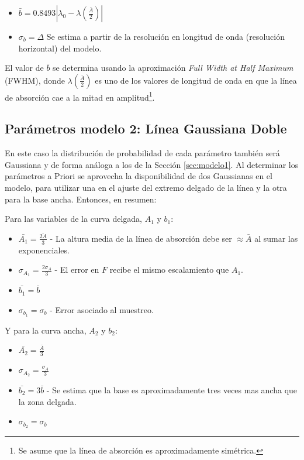 \documentclass{article}
\begin{document}
\begin{itemize}
\item $\bar b = 0.8493|\lambda_0 - \lambda(\frac{\bar A}{2})|$

\item $\sigma_b = \Delta$ Se estima a partir de la resolución en longitud de onda (resolución horizontal) del modelo.
\end{itemize}

El valor de $\bar b$ se determina usando la aproximación \emph{Full Width at Half Maximum} (FWHM), donde $\lambda(\frac{\bar A}{2})$ es uno de los valores de longitud de onda en que la línea de absorción cae a la mitad en amplitud\footnote{Se asume que la línea de absorción es aproximadamente simétrica.}.

\subsection{Parámetros modelo 2: Línea Gaussiana Doble}
\label{sec:modelo2}
En este caso la distribución de probabilidad de cada parámetro también será Gaussiana y de forma análoga a los de la Sección \ref{sec:modelo1}. Al determinar los parámetros a Priori se aprovecha la disponibilidad de dos Gaussianas en el modelo, para utilizar una en el ajuste del extremo delgado de la línea y la otra para la base ancha.  Entonces, en resumen:

Para las variables de la curva delgada, $A_1$ y $b_1$:
\begin{itemize}
  \item $\bar{A_1} = \frac{\bar{2A}}{3}$ - La altura media de la línea de absorción debe ser $\approx \bar{A}$ al sumar las exponenciales.
  
  \item $\sigma_{A_1} = \frac{2\sigma_A}{3}$ - El error en $F$ recibe el mismo escalamiento que $A_1$.
  
  \item $\bar{b_1} = \bar{b}$
  
  \item $\sigma_{b_1} = \sigma_b$ - Error asociado al muestreo.
\end{itemize}

Y para la curva ancha, $A_2$ y $b_2$:

\begin{itemize}
  \item $\bar{A_2} = \frac{\bar{A}}{3}$

  \item $\sigma_{A_2} = \frac{\sigma_A}{3}$

  \item $\bar{b_2} = 3\bar{b}$ - Se estima que la base es aproximadamente tres veces mas ancha que la zona delgada.
  
  \item $\sigma_{b_2} = \sigma_b$
\end{itemize}
\end{document}
